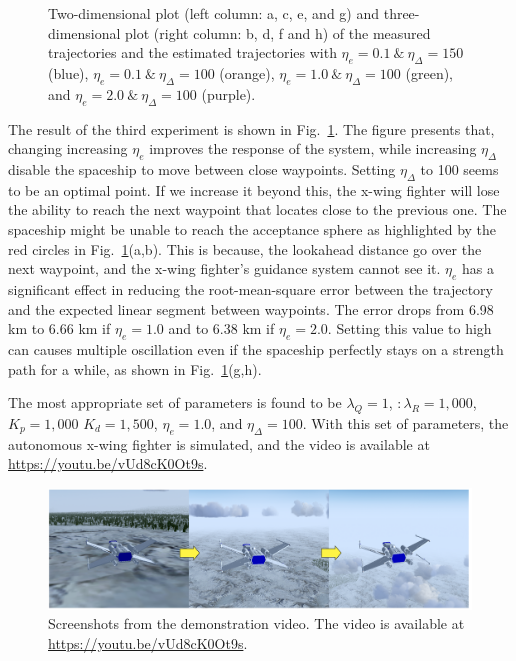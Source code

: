 \begin{figure}[]
	\caption{Two-dimensional plot (left column: a, c, e, and g) and three-dimensional plot (right column: b, d, f and h) of the measured trajectories and the estimated trajectories with $\eta_e=0.1\:\&\:\eta_\Delta=150$ (blue), $\eta_e=0.1\:\&\:\eta_\Delta=100$ (orange), $\eta_e=1.0\:\&\:\eta_\Delta=100$ (green), and $\eta_e=2.0\:\&\:\eta_\Delta=100$ (purple).}
	\label{fig:exp_lookahead}
\end{figure}

 The result of the third experiment is shown in Fig.~\ref{fig:exp_lookahead}. The figure presents that, changing increasing $\eta_e$ improves the response of the system, while increasing $\eta_\Delta$ disable the spaceship to move between close waypoints. Setting $\eta_\Delta$ to 100 seems to be an optimal point. If we increase it beyond this, the x-wing fighter will lose the ability to reach the next waypoint that locates close to the previous one. The spaceship might be unable to reach the acceptance sphere as highlighted by the red circles in Fig.~\ref{fig:exp_lookahead}(a,b). This is because, the lookahead distance go over the next waypoint, and the x-wing fighter's guidance system cannot see it. $\eta_e$ has a significant effect in reducing the root-mean-square error between the trajectory and the expected linear segment between waypoints. The error drops from 6.98 km to 6.66 km if $\eta_e=1.0$ and to 6.38 km if $\eta_e=2.0$. Setting this value to high can causes multiple oscillation even if the spaceship perfectly stays on a strength path for a while, as shown in Fig.~\ref{fig:exp_lookahead}(g,h). 
 
 The most appropriate set of parameters is found to be $\lambda_Q=1$, $:\lambda_R=1,000$, $K_p=1,000$ $K_d=1,500$, $\eta_e=1.0$, and $\eta_\Delta=100$. With this set of parameters, the autonomous x-wing fighter is simulated, and the video is available at \href{https://youtu.be/vUd8cK0Ot9s}{\url{https://youtu.be/vUd8cK0Ot9s}}.

\begin{figure}[!h]
	\centering
	\includegraphics[width=1.0\linewidth]{figures/screenshots}
	\caption{Screenshots from the demonstration video. The video is available at \href{https://youtu.be/vUd8cK0Ot9s}{\url{https://youtu.be/vUd8cK0Ot9s}}.}
	\label{fig:screenshot}
\end{figure}


